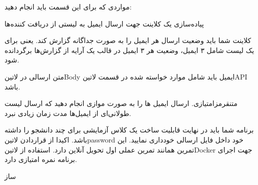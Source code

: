 \documentclass{../assignment}
\begin{document}
مواردی که برای این قسمت باید انجام دهید:

 پیاده‌سازی یک کلاینت جهت ارسال ایمیل به لیستی از دریافت کننده‌ها

 کلاینت شما باید وضعیت ارسال هر ایمیل را به صورت جداگانه گزارش کند.
یعنی برای یک لیست شامل ۳ ایمیل، وضعیت هر ۳ ایمیل در قالب یک آرایه از گزارش‌ها برگردانده شود.

 متن ارسالی در ‌لاتین{Body} ایمیل باید شامل موارد خواسته شده در قسمت ‌لاتین{API} باشد.

 ‌متن{قرمز}{امتیازی.} ارسال ایمیل ها را به صورت موازی انجام دهید که ارسال لیست طولانی‌ای از ایمیل‌ها مدت زمان زیادی نبرد.




 برنامه شما باید در نهایت قابلیت ساخت یک کلاس آزمایشی برای چند دانشجو را داشته باشد.
 اکیدا از قراردادن ‌لاتین{password} خود داخل فایل ارسالی خودداری نمایید.
 این تمرین همانند تمرین عملی اول تحویل آنلاین دارد.
 استفاده از ‌لاتین{Docker} جهت اجرای برنامه نمره امتیازی دارد.



‌ساز
\end{document}
